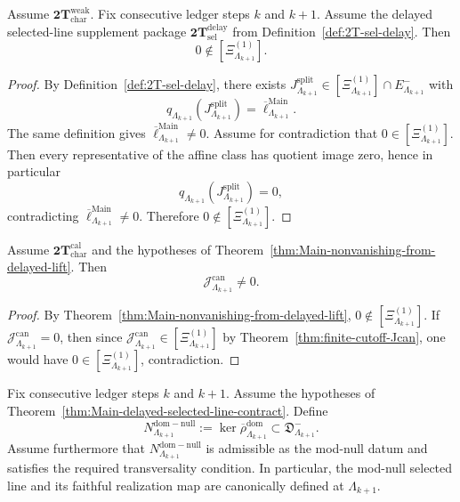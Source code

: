 \begin{theorem}
\label{thm:Main-nonvanishing-from-delayed-lift}
Assume \(\mathbf{2T}_{\mathrm{char}}^{\mathrm{weak}}\).
Fix consecutive ledger steps \(k\) and \(k+1\).
Assume the delayed selected-line supplement package
\(\mathbf{2T}_{\mathrm{sel}}^{\mathrm{delay}}\)
from Definition~\ref{def:2T-sel-delay}.
Then
\[
0\notin[\Xi^{(1)}_{\Lambda_{k+1}}].
\]
\end{theorem}

\begin{proof}
By Definition~\ref{def:2T-sel-delay}, there exists
\(
J^{\mathrm{split}}_{\Lambda_{k+1}}
\in
[\Xi^{(1)}_{\Lambda_{k+1}}]\cap E^-_{\Lambda_{k+1}}
\)
with
\[
q_{\Lambda_{k+1}}(J^{\mathrm{split}}_{\Lambda_{k+1}})
=
\overline\ell^{\mathrm{Main}}_{\Lambda_{k+1}}.
\]
The same definition gives
\(
\overline\ell^{\mathrm{Main}}_{\Lambda_{k+1}}\neq 0
\).
Assume for contradiction that
\(
0\in[\Xi^{(1)}_{\Lambda_{k+1}}]
\).
Then every representative of the affine class has quotient image zero, hence in particular
\[
q_{\Lambda_{k+1}}(J^{\mathrm{split}}_{\Lambda_{k+1}})=0,
\]
contradicting
\(
\overline\ell^{\mathrm{Main}}_{\Lambda_{k+1}}\neq 0
\).
Therefore
\(
0\notin[\Xi^{(1)}_{\Lambda_{k+1}}]
\).
\end{proof}

\begin{corollary}
\label{cor:Jcan-nonzero-from-delayed-lift}
Assume \(\mathbf{2T}_{\mathrm{char}}^{\mathrm{cal}}\) and the hypotheses of
Theorem~\ref{thm:Main-nonvanishing-from-delayed-lift}.
Then
\[
\mathcal J^{\mathrm{can}}_{\Lambda_{k+1}}\neq 0.
\]
\end{corollary}

\begin{proof}
By Theorem~\ref{thm:Main-nonvanishing-from-delayed-lift},
\(
0\notin[\Xi^{(1)}_{\Lambda_{k+1}}]
\).
If \(\mathcal J^{\mathrm{can}}_{\Lambda_{k+1}}=0\), then since
\(
\mathcal J^{\mathrm{can}}_{\Lambda_{k+1}}\in[\Xi^{(1)}_{\Lambda_{k+1}}]
\)
by Theorem~\ref{thm:finite-cutoff-Jcan}, one would have
\(
0\in[\Xi^{(1)}_{\Lambda_{k+1}}]
\), contradiction.
\end{proof}

\begin{corollary}
\label{cor:Main-delayed-dominant-kernel-reentry}
Fix consecutive ledger steps \(k\) and \(k+1\).
Assume the hypotheses of
Theorem~\ref{thm:Main-delayed-selected-line-contract}.
Define
\[
N^{\mathrm{dom-null}}_{\Lambda_{k+1}}
:=
\ker \overline\rho^{\mathrm{dom}}_{\Lambda_{k+1}}
\subset
\mathfrak D^-_{\Lambda_{k+1}}.
\]
Assume furthermore that \(N^{\mathrm{dom-null}}_{\Lambda_{k+1}}\) is admissible
as the mod-null datum and satisfies the required transversality condition.
In particular, the mod-null selected line and its faithful realization map are canonically defined at
\(\Lambda_{k+1}\).
\end{corollary}

